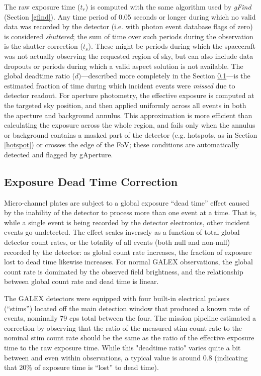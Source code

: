 \documentclass[iop]{emulateapj}
\begin{document}
The raw exposure time ($t_r$) is computed with the same algorithm used by \emph{gFind} (Section \ref{gfind}). Any time period of 0.05 seconds or longer during which no valid data was recorded by the detector (i.e. with photon event database flags of zero) is considered \emph{shuttered}; the sum of time over such periods during the observation is the shutter correction ($t_s$). These might be periods during which the spacecraft was not actually observing the requested region of sky, but can also include data dropouts or periods during which a valid aspect solution is not available. The global deadtime ratio ($d$)---described more completely in the Section \ref{deadtimedesc}---is the estimated fraction of time during which incident events were \emph{missed} due to detector readout. For aperture photometry, the effective exposure is computed at the targeted sky position, and then applied uniformly across all events in both the aperture and background annulus. This approximation is more efficient than calculating the exposure across the whole region, and fails only when the annulus or background contains a masked part of the detector (e.g. hotspots, as in Section \ref{hotspot}) or crosses the edge of the FoV; these conditions are automatically detected and flagged by gAperture.

\subsection{Exposure Dead Time Correction}
\label{deadtimedesc}
Micro-channel plates are subject to a global exposure ``dead time'' effect caused by the inability of the detector to process more than one event at a time. That is, while a single event is being recorded by the detector electronics, other incident events go undetected. The effect scales inversely as a function of total global detector count rates, or the totality of all events (both null and non-null) recorded by the detector: as global count rate increases, the fraction of exposure lost to dead time likewise increases. For normal GALEX observations, the global count rate is dominated by the observed field brightness, and the relationship between global count rate and dead time is linear.

The GALEX detectors were equipped with four built-in electrical pulsers (``stims'') located off the main detection window that produced a known rate of events, nominally 79 cps total between the four. The mission pipeline estimated a correction by observing that the ratio of the measured stim count rate to the nominal stim count rate should be the same as the ratio of the effective exposure time to the raw exposure time. While this "deadtime ratio" varies quite a bit between and even within observations, a typical value is around 0.8 (indicating that 20\% of exposure time is ``lost'' to dead time).
\end{document}
